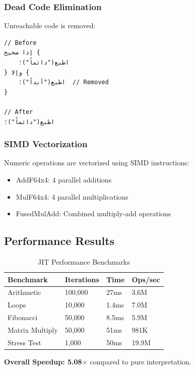 \documentclass[11pt,a4paper]{article}
\begin{document}
\subsubsection{Dead Code Elimination}

Unreachable code is removed:

\begin{lstlisting}[language={},title={Dead Code Elimination}]
// Before
إذا صحيح {
    اطبع("دائماً")؛
} وإلا {
    اطبع("أبداً")؛  // Removed
}

// After
اطبع("دائماً")؛
\end{lstlisting}

\subsubsection{SIMD Vectorization}

Numeric operations are vectorized using SIMD instructions:

\begin{itemize}
    \item AddF64x4: 4 parallel additions
    \item MulF64x4: 4 parallel multiplications
    \item FusedMulAdd: Combined multiply-add operations
\end{itemize}

\subsection{Performance Results}

\begin{table}[h]
\centering
\caption{JIT Performance Benchmarks}
\label{tab:jit-perf}
\begin{tabular}{@{}llll@{}}
\toprule
\textbf{Benchmark} & \textbf{Iterations} & \textbf{Time} & \textbf{Ops/sec} \\
\midrule
Arithmetic & 100,000 & 27ms & 3.6M \\
Loops & 10,000 & 1.4ms & 7.0M \\
Fibonacci & 50,000 & 8.5ms & 5.9M \\
Matrix Multiply & 50,000 & 51ms & 981K \\
Stress Test & 1,000 & 50ms & 19.9M \\
\bottomrule
\end{tabular}
\end{table}

\textbf{Overall Speedup: 5.08$\times$} compared to pure interpretation.
\end{document}
